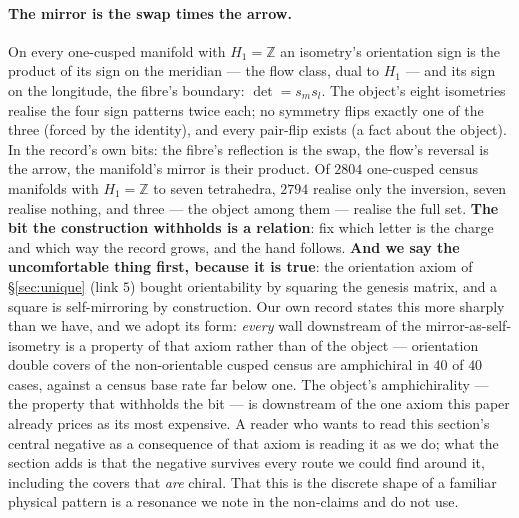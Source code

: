 \documentclass[11pt,a4paper]{article}
\theoremstyle{definition}
\theoremstyle{remark}
\newcommand{\Z}{\mathbb{Z}}
\begin{document}
\paragraph{The mirror is the swap times the arrow.} On every one-cusped manifold with $H_1 = \Z$ an isometry's
orientation sign is the product of its sign on the meridian --- the flow class, dual to $H_1$ --- and its sign
on the longitude, the fibre's boundary: $\det = s_m s_l$. The object's eight isometries realise the four sign
patterns twice each; no symmetry flips exactly one of the three (forced by the identity), and every pair-flip exists (a fact about the object). In the record's own
bits: the fibre's reflection is the swap, the flow's reversal is the arrow, the manifold's mirror is their
product. Of $2804$ one-cusped census manifolds with $H_1 = \Z$ to seven tetrahedra, $2794$ realise only the inversion, seven realise
nothing, and three --- the object among them --- realise the full set. \textbf{The bit the construction withholds
is a relation}: fix which letter is the charge and which way the record grows, and the hand follows. \textbf{And we say
the uncomfortable thing first, because it is true}: the orientation axiom of \S\ref{sec:unique} (link $5$) bought
orientability by squaring the genesis matrix, and a square is self-mirroring by construction. Our own record states
this more sharply than we have, and we adopt its form: \emph{every} wall downstream of the mirror-as-self-isometry is a
property of that axiom rather than of the object --- orientation double covers of the non-orientable cusped census are
amphichiral in $40$ of $40$ cases, against a census base rate far below one. The object's
amphichirality --- the property that withholds the bit --- is downstream of the one axiom this paper already prices as its
most expensive. A reader who wants to read this section's central negative as a consequence of that axiom is reading it as
we do; what the section adds is that the negative survives every route we could find around it, including the covers that
\emph{are} chiral. That this
is the discrete shape of a familiar physical pattern is a resonance we note in the non-claims and do not use.
\end{document}
